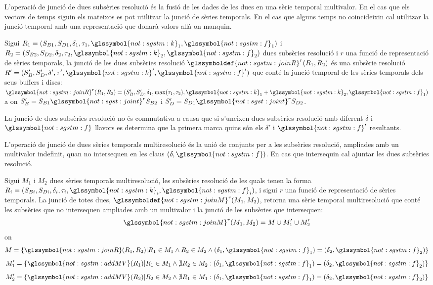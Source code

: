 L'operació de junció de dues subsèries resolució és la fusió de les
dades de les dues en una sèrie temporal multivalor. En el cas que els
vectors de temps siguin els mateixos es pot utilitzar la junció de
sèries temporals. En el cas que alguns temps no coincideixin cal
utilitzar la junció temporal amb una representació que donarà valors
allà on manquin.
\begin{definition}
  Sigui
  $R_1=(S_{B1},S_{D1},\delta_1,\tau_1,\glssymbol{not:sgstm:k}_1,\glssymbol{not:sgstm:f}_1)$
  i
  $R_2=(S_{B2},S_{D2},\delta_2,\tau_2,\glssymbol{not:sgstm:k}_2,\glssymbol{not:sgstm:f}_2)$
  dues subsèries resolució i $r$ una funció de representació de sèries
  temporals, la junció de les dues subsèries resolució
  $\glssymboldef{not:sgstm:joinR}^r(R_1,R_2)$ és una subsèrie
  resolució $R' =
  (S'_B,S'_D,\delta',\tau',\glssymbol{not:sgstm:k}',\glssymbol{not:sgstm:f}')$
  que conté la junció temporal de les sèries temporals dels seus
  buffers i discs: $\glssymbol{not:sgstm:joinR}^r(R_1,R_2)=
  (S'_B,S'_D,\delta_1,\max(\tau_1,\tau_2),\glssymbol{not:sgstm:k}_1+\glssymbol{not:sgstm:k}_2,\glssymbol{not:sgstm:f}_1)$
  a on $S'_B = S_{B1} \glssymbol{not:sgst:joint}^r S_{B2}$ i $S'_D =
  S_{D1} \glssymbol{not:sgst:joint}^r S_{D2}$.
\end{definition}
La junció de dues subsèries resolució no és commutativa a causa que si
s'uneixen dues subsèries resolució amb diferent $\delta$ i
$\glssymbol{not:sgstm:f}$ llavors es determina que la primera marca
quins són els $\delta'$ i $\glssymbol{not:sgstm:f}'$ resultants.



L'operació de junció de dues sèries temporals multiresolució és la
unió de conjunts per a les subsèries resolució, ampliades amb un
multivalor indefinit, quan no intersequen en les claus
$(\delta,\glssymbol{not:sgstm:f})$. En cas que intersequin cal ajuntar
les dues subsèries resolució.
\begin{definition}
  Sigui $M_1$ i $M_2$ dues sèries temporals multiresolució, les
  subsèries resolució de les quals tenen la forma
  $R_i=(S_{Bi},S_{Di},\delta_i,\tau_i,\glssymbol{not:sgstm:k}_i,\glssymbol{not:sgstm:f}_i)$,
  i sigui $r$ una funció de representació de sèries temporals. La
  junció de totes dues, $\glssymboldef{not:sgstm:joinM}^r(M_1, M_2)$,
  retorna una sèrie temporal multiresolució que conté les subsèries
  que no intersequen ampliades amb un multivalor i la junció de les
  subsèries que intersequen:
  \[\glssymbol{not:sgstm:joinM}^r(M_1, M_2)= M \cup M'_{1} \cup
  M'_{2}\] on 
  \[
  M = \{ \glssymbol{not:sgstm:joinR}(R_1,R_2) | R_1\in M_1 \wedge
  R_2\in M_2 \wedge (\delta_1,\glssymbol{not:sgstm:f}_1) =
  (\delta_2,\glssymbol{not:sgstm:f}_2) \}
  \]
  \[
  M_1' = \{\glssymbol{not:sgstm:addMV}(R_1) | R_1\in M_1 \wedge
  \nexists R_2 \in M_2 : (\delta_1,\glssymbol{not:sgstm:f}_1) =
  (\delta_2,\glssymbol{not:sgstm:f}_2) \}
  \]
  \[
  M_2' = \{\glssymbol{not:sgstm:addMV}(R_2)| R_2\in
  M_2 \wedge \nexists R_1 \in M_1 :
  (\delta_1,\glssymbol{not:sgstm:f}_1) =
  (\delta_2,\glssymbol{not:sgstm:f}_2) \}
  \]
\end{definition}





